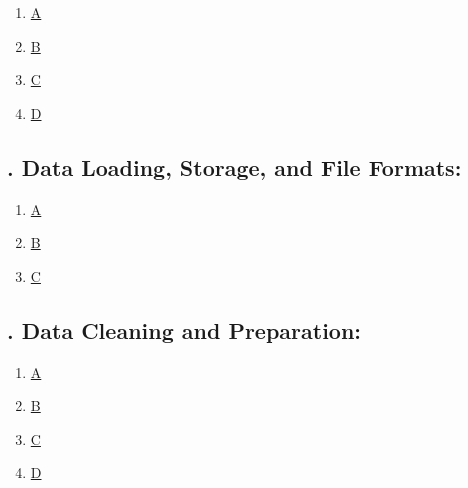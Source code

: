 \documentclass[11pt]{article}
\begin{document}
\begin{multicols}{6}
	\begin{enumerate}
		\item \href{https://mp.weixin.qq.com/s/kWEyNcWtOu4TUiM7UA5Y-w}{A}	%
		\item \href{https://mp.weixin.qq.com/s/SfyeB3zozq1TtHCNFQt6Tg}{B}	%
		\item \href{https://mp.weixin.qq.com/s/pd7Tw0eRB_pnAF3qy9T0sQ}{C}	%
		\item \href{https://mp.weixin.qq.com/s/GsaGGnQcftIkeVIm70VL-A}{D}	%
	\end{enumerate}
\end{multicols}

\subsection*{\small {}. Data Loading, Storage, and File Formats:}

\vspace{-0.5cm}

\begin{multicols}{6}
	\begin{enumerate}
		\item \href{https://mp.weixin.qq.com/s/GODbdMaEuMb5UbXJTotS6Q}{A}	%
		\item \href{https://mp.weixin.qq.com/s/kE7Q9i1lYvZls1sZjgv31g}{B}	%
		\item \href{https://mp.weixin.qq.com/s/uvDA7CobmBM-_Qps3D08vQ}{C}	%
	\end{enumerate}
\end{multicols}

\subsection*{\small {}. Data Cleaning and Preparation:}

\vspace{-0.5cm}

\begin{multicols}{6}
	\begin{enumerate}
		\item \href{https://mp.weixin.qq.com/s/5WsK8aH8fhxuvx8eEZu42A}{A}	%
		\item \href{https://mp.weixin.qq.com/s/3BCWj3wsFHWRwflpZQzJUw}{B}	%
		\item \href{https://mp.weixin.qq.com/s/DWZEiB1vHJMIALLaP9P-7w}{C}	%
		\item \href{https://mp.weixin.qq.com/s/wNnIYTLloSLdW8IOxCRFzg}{D}	%
	\end{enumerate}
\end{multicols}
\end{document}
